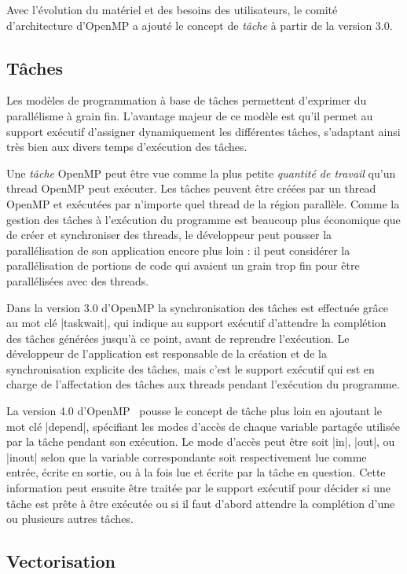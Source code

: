 Avec l'évolution du matériel et des besoins des utilisateurs, le comité d'architecture d'OpenMP a ajouté le concept de \emph{tâche} à partir de la version 3.0.



\subsection{Tâches}

Les modèles de programmation à base de tâches permettent d'exprimer du parallélisme à grain fin. L'avantage majeur de ce modèle est qu'il permet au support exécutif d'assigner dynamiquement les différentes tâches, s'adaptant ainsi très bien aux divers temps d'exécution des tâches.

Une \emph{tâche} OpenMP peut être vue comme la plus petite \emph{quantité de travail} qu'un thread OpenMP peut exécuter.
Les tâches peuvent être créées par un thread OpenMP et exécutées par n'importe quel thread de la région parallèle.
Comme la gestion des tâches à l'exécution du programme est beaucoup plus économique que de créer et synchroniser des threads, le développeur peut pousser la parallélisation de son application encore plus loin : il peut considérer la parallélisation de portions de code qui avaient un grain trop fin pour être parallélisées avec des threads.

Dans la version 3.0 d'OpenMP la synchronisation des tâches est effectuée grâce au mot clé |taskwait|, qui indique au support exécutif d'attendre la complétion des tâches générées jusqu'à ce point, avant de reprendre l'exécution.
Le développeur de l'application est responsable de la création et de la synchronisation explicite des tâches, mais c'est le support exécutif qui est en charge de l'affectation des tâches aux threads pendant l'exécution du programme.

La version 4.0 d'OpenMP~\cite{openmp40} pousse le concept de tâche plus loin en ajoutant le mot clé |depend|, spécifiant les modes d'accès de chaque variable partagée utilisée par la tâche pendant son exécution.
Le mode d'accès peut être soit |in|, |out|, ou |inout| selon que la variable correspondante soit respectivement lue comme entrée, écrite en sortie, ou à la fois lue et écrite par la tâche en question.
Cette information peut ensuite être traitée par le support exécutif pour décider si une tâche est prête à être exécutée ou si il faut d'abord attendre la complétion d'une ou plusieurs autres tâches.


\subsection{Vectorisation}

